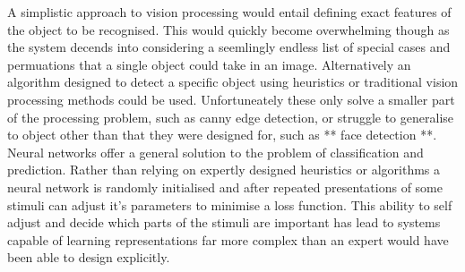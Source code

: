 A simplistic approach to vision processing would entail defining exact features of the object to be recognised.
This would quickly become overwhelming though as the system decends into considering a seemlingly endless list of special cases and permuations that a single object could take in an image.
Alternatively an algorithm designed to detect a specific object using heuristics or traditional vision processing methods could be used.
Unfortuneately these only solve a smaller part of the processing problem, such as canny edge detection, or struggle to generalise to object other than that they were designed for, such as ** face detection **.
Neural networks offer a general solution to the problem of classification and prediction.
Rather than relying on expertly designed heuristics or algorithms a neural network is randomly initialised and after repeated presentations of some stimuli can adjust it's parameters to minimise a loss function. 
This ability to self adjust and decide which parts of the stimuli are important has lead to systems capable of learning representations far more complex than an expert would have been able to design explicitly. 






